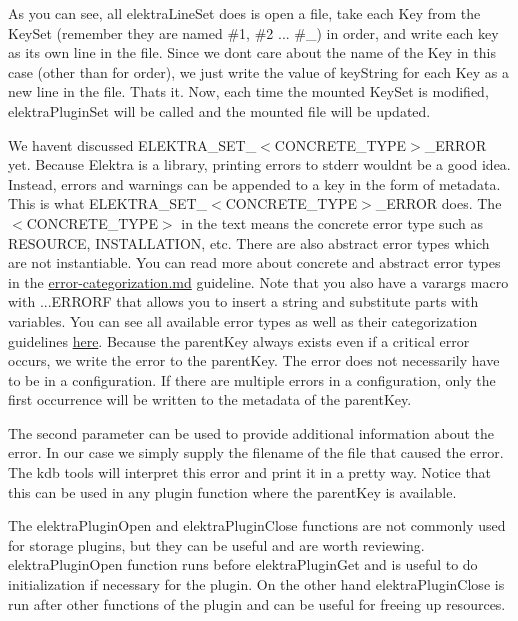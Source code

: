 As you can see, all {\ttfamily elektra\+Line\+Set} does is open a file, take each {\ttfamily Key} from the {\ttfamily Key\+Set} (remember they are named {\ttfamily \#1}, {\ttfamily \#2} ... {\ttfamily \#\+\_}) in order, and write each key as its own line in the file. Since we don\textquotesingle{}t care about the name of the {\ttfamily Key} in this case (other than for order), we just write the value of {\ttfamily key\+String} for each {\ttfamily Key} as a new line in the file. That\textquotesingle{}s it. Now, each time the mounted {\ttfamily Key\+Set} is modified, {\ttfamily elektra\+Plugin\+Set} will be called and the mounted file will be updated.

We haven\textquotesingle{}t discussed {\ttfamily E\+L\+E\+K\+T\+R\+A\+\_\+\+S\+E\+T\+\_\+$<$C\+O\+N\+C\+R\+E\+T\+E\+\_\+\+T\+Y\+PE$>$\+\_\+\+E\+R\+R\+OR} yet. Because Elektra is a library, printing errors to stderr wouldn\textquotesingle{}t be a good idea. Instead, errors and warnings can be appended to a key in the form of metadata. This is what {\ttfamily E\+L\+E\+K\+T\+R\+A\+\_\+\+S\+E\+T\+\_\+$<$C\+O\+N\+C\+R\+E\+T\+E\+\_\+\+T\+Y\+PE$>$\+\_\+\+E\+R\+R\+OR} does. The {\ttfamily $<$C\+O\+N\+C\+R\+E\+T\+E\+\_\+\+T\+Y\+PE$>$} in the text means the concrete error type such as {\ttfamily R\+E\+S\+O\+U\+R\+CE}, {\ttfamily I\+N\+S\+T\+A\+L\+L\+A\+T\+I\+ON}, etc. There are also abstract error types which are not instantiable. You can read more about concrete and abstract error types in the \mbox{\hyperlink{doc_dev_error-categorization_md}{error-\/categorization.md}} guideline. Note that you also have a varargs macro with {\ttfamily ...E\+R\+R\+O\+RF} that allows you to insert a string and substitute parts with variables. You can see all available error types as well as their categorization guidelines \mbox{\hyperlink{doc_dev_error-categorization_md}{here}}. Because the parent\+Key always exists even if a critical error occurs, we write the error to the parent\+Key. The error does not necessarily have to be in a configuration. If there are multiple errors in a configuration, only the first occurrence will be written to the metadata of the {\ttfamily parent\+Key}.

The second parameter can be used to provide additional information about the error. In our case we simply supply the filename of the file that caused the error. The kdb tools will interpret this error and print it in a pretty way. Notice that this can be used in any plugin function where the parent\+Key is available.

The {\ttfamily elektra\+Plugin\+Open} and {\ttfamily elektra\+Plugin\+Close} functions are not commonly used for storage plugins, but they can be useful and are worth reviewing. {\ttfamily elektra\+Plugin\+Open} function runs before {\ttfamily elektra\+Plugin\+Get} and is useful to do initialization if necessary for the plugin. On the other hand {\ttfamily elektra\+Plugin\+Close} is run after other functions of the plugin and can be useful for freeing up resources.

